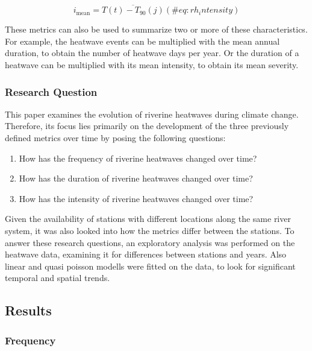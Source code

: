 \documentclass[
]{article}
\begin{document}
\begin{equation}
i_{\mathrm{mean}}
=
\overline{T(t)-T_{90}(j)}
(\#eq:rh_intensity)
\end{equation}

These metrics can also be used to summarize two or more of these
characteristics. For example, the heatwave events can be multiplied with
the mean annual duration, to obtain the number of heatwave days per
year. Or the duration of a heatwave can be multiplied with its mean
intensity, to obtain its mean severity.

\subsubsection{Research Question}\label{research-question}

This paper examines the evolution of riverine heatwaves during climate
change. Therefore, its focus lies primarily on the development of the
three previously defined metrics over time by posing the following
questions:

\begin{enumerate}
\def\labelenumi{\arabic{enumi}.}
\item
  How has the frequency of riverine heatwaves changed over time?
\item
  How has the duration of riverine heatwaves changed over time?
\item
  How has the intensity of riverine heatwaves changed over time?
\end{enumerate}

Given the availability of stations with different locations along the
same river system, it was also looked into how the metrics differ
between the stations. To answer these research questions, an exploratory
analysis was performed on the heatwave data, examining it for
differences between stations and years. Also linear and quasi poisson
modells were fitted on the data, to look for significant temporal and
spatial trends.

\subsection{Results}\label{results}

\subsubsection{Frequency}\label{frequency}
\end{document}
